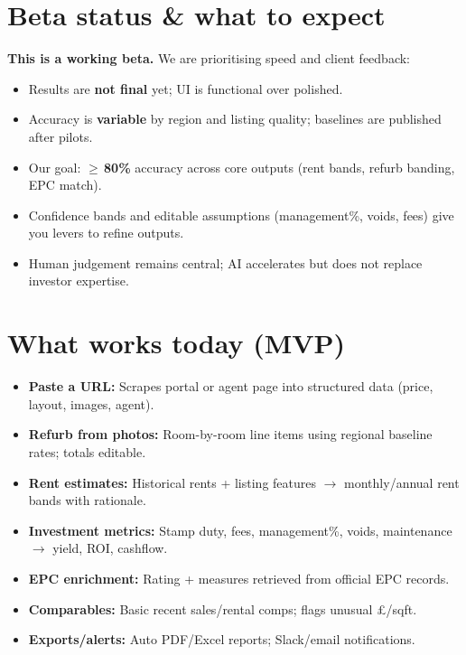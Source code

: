 \documentclass[11pt,a4paper]{article}
\begin{document}
\section*{Beta status \& what to expect}
\textbf{This is a working beta.} We are prioritising speed and client feedback:
\begin{itemize}
  \item Results are \textbf{not final} yet; UI is functional over polished.
  \item Accuracy is \textbf{variable} by region and listing quality; baselines are published after pilots.
  \item Our goal: \textbf{$\geq$\,80\%} accuracy across core outputs (rent bands, refurb banding, EPC match).
  \item Confidence bands and editable assumptions (management\%, voids, fees) give you levers to refine outputs.
  \item Human judgement remains central; AI accelerates but does not replace investor expertise.
\end{itemize}

\section*{What works today (MVP)}
\begin{itemize}
  \item \textbf{Paste a URL:} Scrapes portal or agent page into structured data (price, layout, images, agent).
  \item \textbf{Refurb from photos:} Room-by-room line items using regional baseline rates; totals editable.
  \item \textbf{Rent estimates:} Historical rents + listing features $\rightarrow$ monthly/annual rent bands with rationale.
  \item \textbf{Investment metrics:} Stamp duty, fees, management\%, voids, maintenance $\rightarrow$ yield, ROI, cashflow.
  \item \textbf{EPC enrichment:} Rating + measures retrieved from official EPC records.
  \item \textbf{Comparables:} Basic recent sales/rental comps; flags unusual £/sqft.
  \item \textbf{Exports/alerts:} Auto PDF/Excel reports; Slack/email notifications.
\end{itemize}
\end{document}
